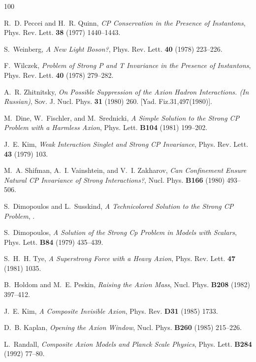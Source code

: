 \documentclass[11pt]{article}
\renewcommand{\[}{\begin{equation}}
\renewcommand{\]}{\end{equation}}
\begin{document}
\providecommand{\href}[2]{#2}\begingroup\raggedright\begin{thebibliography}{100}

R.~D. Peccei and H.~R. Quinn, {\it {CP Conservation in the Presence of
  Instantons}},  Phys. Rev. Lett. {\bf 38} (1977) 1440--1443.

S.~Weinberg, {\it {A New Light Boson?}},  Phys. Rev. Lett. {\bf 40} (1978)
  223--226.

F.~Wilczek, {\it {Problem of Strong P and T Invariance in the Presence of
  Instantons}},  Phys. Rev. Lett. {\bf 40} (1978) 279--282.

A.~R. Zhitnitsky, {\it {On Possible Suppression of the Axion Hadron
  Interactions. (In Russian)}},  Sov. J. Nucl. Phys. {\bf 31} (1980) 260. [Yad.
  Fiz.31,497(1980)].

M.~Dine, W.~Fischler, and M.~Srednicki, {\it {A Simple Solution to the Strong
  CP Problem with a Harmless Axion}},  Phys. Lett. {\bf B104} (1981) 199--202.

J.~E. Kim, {\it {Weak Interaction Singlet and Strong CP Invariance}},  Phys.
  Rev. Lett. {\bf 43} (1979) 103.

M.~A. Shifman, A.~I. Vainshtein, and V.~I. Zakharov, {\it {Can Confinement
  Ensure Natural CP Invariance of Strong Interactions?}},  Nucl. Phys. {\bf
  B166} (1980) 493--506.

S.~Dimopoulos and L.~Susskind, {\it {A Technicolored Solution to the Strong CP
  Problem}}, .

S.~Dimopoulos, {\it {A Solution of the Strong {Cp} Problem in Models with
  Scalars}},  Phys. Lett. {\bf B84} (1979) 435--439.

S.~H.~H. Tye, {\it {A Superstrong Force with a Heavy Axion}},  Phys. Rev. Lett.
  {\bf 47} (1981) 1035.

B.~Holdom and M.~E. Peskin, {\it {Raising the Axion Mass}},  Nucl. Phys. {\bf
  B208} (1982) 397--412.

J.~E. Kim, {\it {A Composite Invisible Axion}},  Phys. Rev. {\bf D31} (1985)
  1733.

D.~B. Kaplan, {\it {Opening the Axion Window}},  Nucl. Phys. {\bf B260} (1985)
  215--226.

L.~Randall, {\it {Composite Axion Models and Planck Scale Physics}},  Phys.
  Lett. {\bf B284} (1992) 77--80.


\end{thebibliography}
\end{document}
